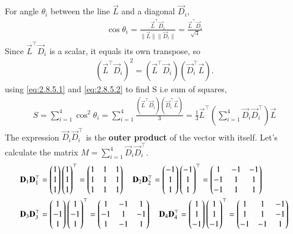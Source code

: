 \documentclass[journal]{IEEEtran}
\begin{document}
\noindent
For angle $\theta_i$ between the line $\vec{L}$ and a diagonal $\vec{D}_i$,
\begin{align}
    \cos\theta_i = \frac{\vec{L}^\top \vec{D}_i}{\|\vec{L}\| \|\vec{D}_i\|} = \frac{\vec{L}^\top \vec{D}_i}{\sqrt{3}}
    \label{eq:2.8.5.1}
\end{align}
Since $\vec{L}^\top \vec{D}_i$ is a scalar, it equals its own transpose, so 
\begin{align}
(\vec{L}^\top \vec{D}_i)^2 = (\vec{L}^\top \vec{D}_i)(\vec{D}_i^\top \vec{L}).  
\label{eq:2.8.5.2}
\end{align}
using \eqref{eq:2.8.5.1} and \eqref{eq:2.8.5.2} to find S i.e sum of squares,
\begin{align} 
    S = \sum_{i=1}^{4} \cos^2\theta_i = \sum_{i=1}^{4} \frac{(\vec{L}^\top \vec{D}_i)(\vec{D}_i^\top \vec{L})}{3} = \frac{1}{3} \vec{L}^\top \left( \sum_{i=1}^{4} \vec{D}_i \vec{D}_i^\top \right) \vec{L}
    \label{eq:quad.form}
\end{align}
The expression $\vec{D}_i \vec{D}_i^\top$ is the \textbf{outer product} of the vector with itself. Let's calculate the matrix $M = \sum_{i=1}^{4} \vec{D}_i \vec{D}_i^\top$.
\begin{align}
    \mathbf{D}_1\mathbf{D}_1^\top &= \begin{pmatrix}1\\1\\1\end{pmatrix}\begin{pmatrix}1\\1\\1\end{pmatrix}^\top = \begin{pmatrix}1&1&1\\1&1&1\\1&1&1\end{pmatrix}\quad
    \mathbf{D}_2\mathbf{D}_2^\top = \begin{pmatrix}-1\\1\\1\end{pmatrix}\begin{pmatrix}-1\\1\\1\end{pmatrix}^\top = \begin{pmatrix}1&-1&-1\\-1&1&1\\-1&1&1\end{pmatrix} \nonumber \\
    \mathbf{D}_3\mathbf{D}_3^\top &= \begin{pmatrix}1\\-1\\1\end{pmatrix}\begin{pmatrix}1\\-1\\1\end{pmatrix}^\top = \begin{pmatrix}1&-1&1\\-1&1&-1\\1&-1&1\end{pmatrix} \quad
    \mathbf{D}_4\mathbf{D}_4^\top = \begin{pmatrix}1\\1\\-1\end{pmatrix}\begin{pmatrix}1\\1\\-1\end{pmatrix}^\top = \begin{pmatrix}1&1&-1\\1&1&-1\\-1&-1&1\end{pmatrix} \nonumber
\end{align}
\end{document}
